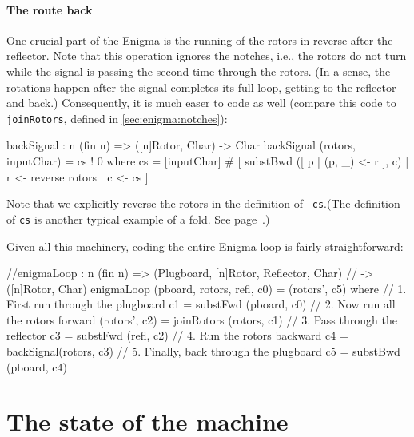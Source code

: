 \paragraph*{The route back} One crucial part of the Enigma is the
running of the rotors in reverse after the reflector. Note that this
operation ignores the notches, i.e., the rotors do not turn while the
signal is passing the second time through the rotors. (In a sense, the
rotations happen after the signal completes its full loop, getting to
the reflector and back.)  Consequently, it is much easer to code as
well (compare this code to {\tt joinRotors}, defined in
\autoref{sec:enigma:notches}):

\begin{code}
  backSignal : {n} (fin n) => ([n]Rotor, Char) -> Char
  backSignal (rotors, inputChar) = cs ! 0
    where
      cs = [inputChar] # [  substBwd ([ p | (p, _) <- r ], c)
                         | r <- reverse rotors
                         | c <- cs
                         ]
\end{code}
Note that we explicitly reverse the rotors in the definition of {\tt
  cs}.\indReverse (The definition of {\tt cs} is another typical
example of a fold. See page~\pageref{par:fold}.)\indFold

Given all this machinery, coding the entire Enigma loop is fairly
straightforward:
\begin{code}
  //enigmaLoop : {n} (fin n) => (Plugboard, [n]Rotor, Reflector, Char)
  //                         -> ([n]Rotor, Char)
  enigmaLoop (pboard, rotors, refl, c0) = (rotors', c5)
    where
      // 1. First run through the plugboard
      c1 = substFwd (pboard, c0)
      // 2. Now run all the rotors forward
      (rotors', c2) = joinRotors (rotors, c1)
      // 3. Pass through the reflector
      c3 = substFwd (refl, c2)
      // 4. Run the rotors backward
      c4 = backSignal(rotors, c3)
      // 5. Finally, back through the plugboard
      c5 = substBwd (pboard, c4)
\end{code}

\section{The state of the machine}
\label{sec:state-machine}

